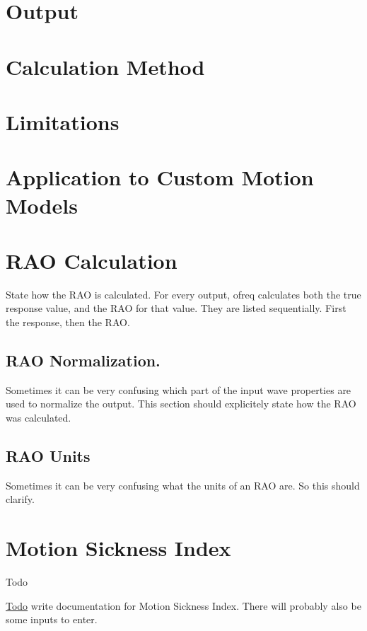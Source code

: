 \section*{Output}

\section*{Calculation Method}

\section*{Limitations}

\section*{Application to Custom Motion Models}

\section*{R\-A\-O Calculation}

State how the R\-A\-O is calculated. For every output, ofreq calculates both the true response value, and the R\-A\-O for that value. They are listed sequentially. First the response, then the R\-A\-O.

\subsection*{R\-A\-O Normalization.}

Sometimes it can be very confusing which part of the input wave properties are used to normalize the output. This section should explicitely state how the R\-A\-O was calculated.

\subsection*{R\-A\-O Units}

Sometimes it can be very confusing what the units of an R\-A\-O are. So this should clarify. \hypertarget{local_msi}{}\section{Motion Sickness Index}\label{local_msi}
\begin{DoxyRefDesc}{Todo}
\item[\hyperlink{todo__todo000027}{Todo}]write documentation for Motion Sickness Index. There will probably also be some inputs to enter.\end{DoxyRefDesc}


